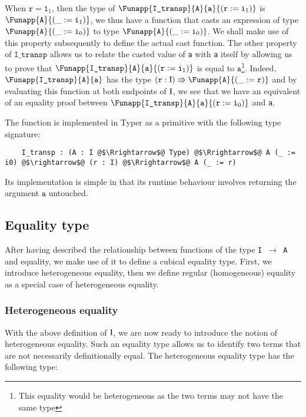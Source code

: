 \documentclass[12pt,twoside,maitrise]{dms}
\theoremstyle{definition}
\numberwithin{equation}{section}
\numberwithin{table}{chapter}
\numberwithin{figure}{chapter}
\newcommand\id[1] {\texttt{#1}}
\newcommand\fn[1] {\texttt{#1}}
\begin{document}
When $\id{r} = \id{1}_1$, then the type of
$\Funapp{\id{I\_transp}}{\id{A}}{\id{a}}{(\earg{\id{r}}{\id{i}_1})}$ is
$\Funapp{\id{A}}{(\earg{\id{i}_1})}$, we thus have a function that casts an
expression of type $\Funapp{\id{A}}{(\earg{\id{i}_0})}$ to type
$\Funapp{\id{A}}{(\earg{\id{i}_0})}$. We shall make use of this property
subsequently to define the actual cast function. The other property of
$\id{I\_transp}$ allows us to relate the casted value of \id{a} with \id{a}
itself by allowing us to prove that
$\Funapp{\id{I\_transp}}{\id{A}}{\id{a}}{(\earg{\id{r}}{\id{i}_1})}$ is equal to
$\id{a}$\footnote{This equality would be heterogeneous as the two terms may not
have the same type}. Indeed, $\Funapp{\id{I\_transp}}{\id{A}}{\id{a}}$ has the
type $(\id{r} : \bI) \Rrightarrow \Funapp{\id{A}}{(\earg{\id{r}})}$ and by
evaluating this function at both endpoints of $\mathrm{I}$, we see that we have an
equivalent of an equality proof between
$\Funapp{\id{I\_transp}}{\id{A}}{\id{a}}{(\earg{\id{r}}{\id{i}_0})}$ and \id{a}.

The function is implemented in Typer as a primitive with the following type
signature:

\begin{verbatim}
    I_transp : (A : I @$\Rrightarrow$@ Type) @$\Rrightarrow$@ A (_ := i0) @$\rightarrow$@ (r : I) @$\Rrightarrow$@ A (_ := r)
\end{verbatim}

Its implementation is simple in that its runtime behaviour involves returning
the argument $\id{a}$ untouched.

\subsection{Equality type}\label{sec:identity}

After having described the relationship between functions of the type \fn{I
  $\rightarrow$ A} and equality, we make use of it to define a cubical equality
type. First, we introduce heterogeneous equality, then we define regular
(homogeneous) equality as a special case of heterogeneous equality.

\subsubsection{Heterogeneous equality}
With the above definition of $\mathrm{I}$, we are now ready to introduce the notion of
heterogeneous equality. Such an equality type allows us to identify two terms
that are not necessarily definitionally equal. The heterogeneous equality type
has the following type:
\end{document}

